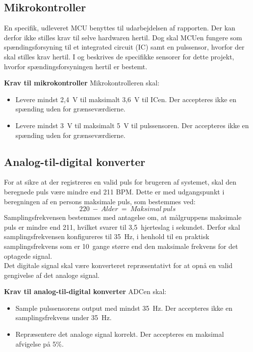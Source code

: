 \subsection{Mikrokontroller} \label{krav_mikro_spaending}
En specifik, udleveret MCU benyttes til udarbejdelsen af rapporten. Der kan derfor ikke stilles krav til selve hardwaren hertil. Dog skal MCUen fungere som spændingsforsyning til et integrated circuit (IC) samt en pulssensor, hvorfor der skal stilles krav hertil. I  og  beskrives de specifikke sensorer for dette projekt, hvorfor spændingsforsyningen hertil er bestemt.

\textbf{Krav til mikrokontroller} \newline 
Mikrokontrolleren skal:
\begin{itemize}
	\item Levere mindst 2,4~V til maksimalt 3,6~V til ICen. Der accepteres ikke en spænding uden for grænseværdierne.
	\item Levere mindst 3~V til maksimalt 5~V til pulssensoren. Der accepteres ikke en spænding uden for grænseværdierne.
\end{itemize}

\subsection{Analog-til-digital konverter} \label{krav_adc}
For at sikre at der registreres en valid puls for brugeren af systemet, skal den beregnede puls være mindre end 211 BPM. Dette er med udgangspunkt i beregningen af en persons maksimale puls, som bestemmes ved:~\citep{CooperBlair2005} 
\begin{equation}
220~-~Alder~=~Maksimal~puls
\end{equation}
Samplingsfrekvensen bestemmes med antagelse om, at målgruppens maksimale puls er mindre end 211, hvilket svarer til 3,5~hjerteslag i sekundet. Derfor skal samplingsfrekvensen konfigureres til 35~Hz, i henhold til en praktisk samplingsfrekvens som er 10~gange større end den maksimale frekvens for det optagede signal.~\citep{Webster2011}\\
Det digitale signal skal være konverteret repræsentativt for at opnå en valid gengivelse af det analoge signal.

\textbf{Krav til analog-til-digital konverter} \newline
ADCen skal:
\begin{itemize}
	\item Sample pulssensorens output med mindst 35~Hz. Der accepteres ikke en samplingsfrekvens under 35~Hz. 
	\item Repræsentere det analoge signal korrekt. Der accepteres en maksimal afvigelse på 5\%. 
\end{itemize}

